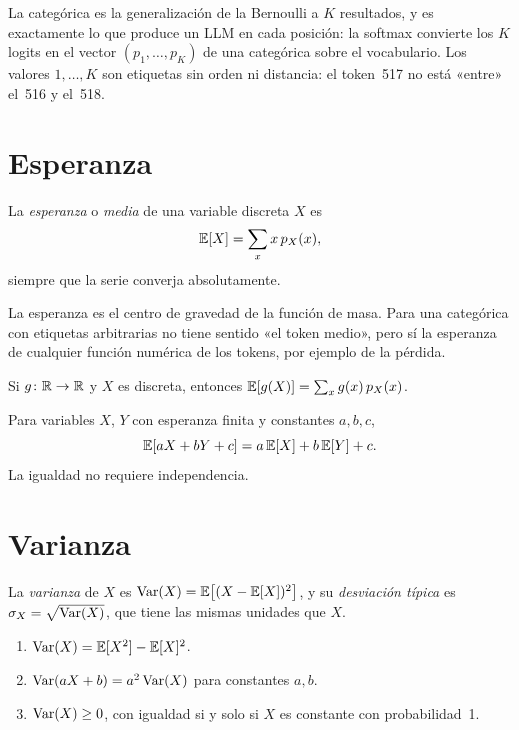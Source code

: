 La categórica es la generalización de la Bernoulli a $K$ resultados, y es exactamente lo que produce un LLM en cada posición: la softmax convierte los $K$ logits en el vector $(p_1,\dots,p_K)$ de una categórica sobre el vocabulario. Los valores $1,\dots,K$ son etiquetas sin orden ni distancia: el token~517 no está «entre» el~516 y el~518.

\addtocounter{definicion}{1}%

\section{Esperanza}

\begin{definicion}[Esperanza]\label{def:esperanza}
La \emph{esperanza} o \emph{media} de una variable discreta $X$ es
\[
\mathbb{E}[X]=\sum_x x\,p_X(x),
\]
siempre que la serie converja absolutamente.
\end{definicion}

La esperanza es el centro de gravedad de la función de masa. Para una categórica con etiquetas arbitrarias no tiene sentido «el token medio», pero sí la esperanza de cualquier función numérica de los tokens, por ejemplo de la pérdida.

\begin{teorema}\label{teo:lotus}
Si $g\colon\mathbb{R}\to\mathbb{R}$ y $X$ es discreta, entonces $\mathbb{E}[g(X)]=\sum_x g(x)\,p_X(x)$.
\end{teorema}

\begin{proposicion}[Linealidad]\label{prop:linealidad}
Para variables $X$, $Y$ con esperanza finita y constantes $a,b,c$,
\[
\mathbb{E}[aX+bY+c]=a\,\mathbb{E}[X]+b\,\mathbb{E}[Y]+c.
\]
La igualdad no requiere independencia.
\end{proposicion}

\addtocounter{definicion}{1}%

\section{Varianza}

\begin{definicion}[Varianza]\label{def:varianza}
La \emph{varianza} de $X$ es $\operatorname{Var}(X)=\mathbb{E}\bigl[(X-\mathbb{E}[X])^{2}\bigr]$, y su \emph{desviación típica} es $\sigma_X=\sqrt{\operatorname{Var}(X)}$, que tiene las mismas unidades que $X$.
\end{definicion}

\begin{proposicion}\label{prop:varianza}
\begin{enumerate}
  \item $\operatorname{Var}(X)=\mathbb{E}[X^{2}]-\mathbb{E}[X]^{2}$.
  \item $\operatorname{Var}(aX+b)=a^{2}\operatorname{Var}(X)$ para constantes $a,b$.
  \item $\operatorname{Var}(X)\ge 0$, con igualdad si y solo si $X$ es constante con probabilidad~1.
\end{enumerate}
\end{proposicion}

